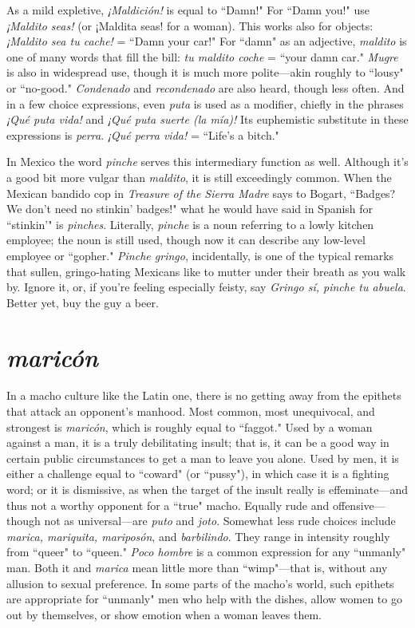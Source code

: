 As a mild expletive, \emph{¡Maldición!} is equal to ``Damn!" For
``Damn you!" use \emph{¡Maldito seas!} (or ¡Maldita seas! for a woman). This
works also for objects: \emph{¡Maldito sea tu cache!} = ``Damn your car!" For
``damn" as an adjective, \emph{maldito} is one of many words that fill the bill:
\emph{tu maldito coche} = ``your damn car." \emph{Mugre} is also in widespread use,
though it is much more polite---akin roughly to ``lousy" or ``no-good."
\emph{Condenado} and \emph{recondenado} are also heard, though less often. And in
a few choice expressions, even \emph{puta} is used as a modifier, chiefly in the
phrases \emph{¡Qué puta vida!} and \emph{¡Qué puta suerte (la mía)!} Its euphemistic substitute in these expressions is \emph{perra}. \emph{¡Qué perra vida!} = ``Life's
a bitch."

In Mexico the word \emph{pinche} serves this intermediary function
as well. Although it's a good bit more vulgar than \emph{maldito}, it is still
exceedingly common. When the Mexican bandido cop in \emph{Treasure of
the Sierra Madre} says to Bogart, ``Badges? We don't need no stinkin'
badges!" what he would have said in Spanish for ``stinkin'" is \emph{pinches}.
Literally, \emph{pinche} is a noun referring to a lowly kitchen employee; the
noun is still used, though now it can describe any low-level employee
or ``gopher." \emph{Pinche gringo}, incidentally, is one of the typical remarks
that sullen, gringo-hating Mexicans like to mutter under their breath
as you walk by. Ignore it, or, if you're feeling especially feisty, say
\emph{Gringo sí, pinche tu abuela}. Better yet, buy the guy a beer.

\section{\emph{maricón}}

In a macho culture like the Latin one, there is no getting away
from the epithets that attack an opponent's manhood. Most common,
most unequivocal, and strongest is \emph{maricón}, which is roughly equal to
``faggot." Used by a woman against a man, it is a truly debilitating insult; that is, it can be a good way in certain public circumstances to get
a man to leave you alone. Used by men, it is either a challenge equal to
``coward" (or ``pussy"), in which case it is a fighting word; or it is dismissive, as when the target of the insult really is effeminate---and thus
not a worthy opponent for a ``true" macho. Equally rude and offensive---though not as universal---are \emph{puto} and \emph{joto}. Somewhat less rude
choices include \emph{marica, mariquita, mariposón}, and \emph{barbilindo}. They
range in intensity roughly from ``queer" to ``queen." \emph{Poco hombre} is a
common expression for any ``unmanly" man. Both it and \emph{marica} mean
little more than ``wimp"---that is, without any allusion to sexual preference. In some parts of the macho's world, such epithets are appropriate for ``unmanly" men who help with the dishes, allow women to go
out by themselves, or show emotion when a woman leaves them.


